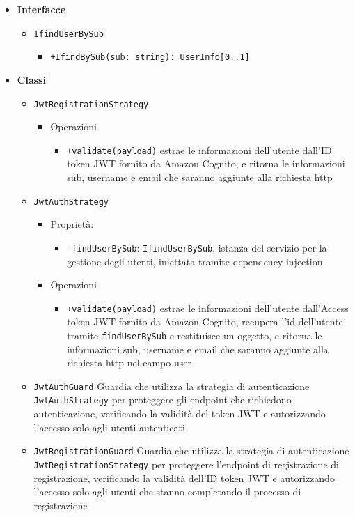 \documentclass[a4paper, 11pt]{article}
\newcounter{subsubsubsection}[subsubsection]
\newcounter{subsubsubsubsection}[subsubsubsection]
\begin{document}
\begin{itemize}
	\item \textbf{Interfacce}
		\begin{itemize}
			\item \texttt{IfindUserBySub}
				\begin{itemize}
					\item \texttt{+IfindBySub(sub: string): UserInfo[0..1]}
				\end{itemize}
		\end{itemize}
	\item \textbf{Classi}
		\begin{itemize}
			\item \texttt{JwtRegistrationStrategy}
				\begin{itemize}
					\item Operazioni
						\begin{itemize}
							\item \texttt{+validate(payload)} estrae le informazioni dell'utente dall'ID token JWT fornito da Amazon Cognito, e ritorna le informazioni sub, username e email che saranno aggiunte alla richiesta http
						\end{itemize}
				\end{itemize}
			\item \texttt{JwtAuthStrategy}
				\begin{itemize}
					\item Proprietà:
						\begin{itemize}
							\item \texttt{-findUserBySub}: \texttt{IfindUserBySub}, istanza del servizio per la gestione degli utenti, iniettata tramite dependency injection
						\end{itemize}
					\item Operazioni
						\begin{itemize}
							\item \texttt{+validate(payload)} estrae le informazioni dell'utente dall'Access token JWT fornito da Amazon Cognito, recupera l'id dell'utente tramite \texttt{findUserBySub} e restituisce un oggetto, e ritorna le informazioni sub, username e email che saranno aggiunte alla richiesta http nel campo user
						\end{itemize}
				\end{itemize}
			\item \texttt{JwtAuthGuard}
				Guardia che utilizza la strategia di autenticazione \texttt{JwtAuthStrategy} per proteggere gli endpoint che richiedono autenticazione, verificando la validità del token JWT e autorizzando l'accesso solo agli utenti autenticati
			\item \texttt{JwtRegistrationGuard}
				Guardia che utilizza la strategia di autenticazione \texttt{JwtRegistrationStrategy} per proteggere l'endpoint di registrazione di registrazione, verificando la validità dell'ID token JWT e autorizzando l'accesso solo agli utenti che stanno completando il processo di registrazione

			
		\end{itemize}
\end{itemize}
\end{document}
